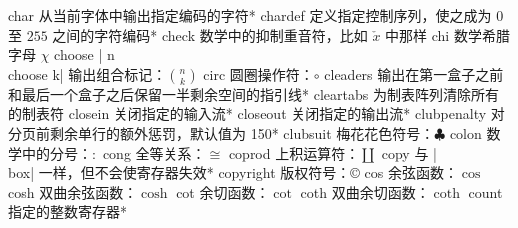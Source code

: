 \capcs char {从当前字体中输出指定编码的字符}*{}
\capcs chardef {定义指定控制序列，使之成为 0 至 $255$ 之间的字符编码}*{}
\capcs check {数学中的抑制重音符，比如 $\check x$ 中那样}{}{}
\capcs chi {数学希腊字母 $\chi$}{}{}
\capcs choose {| n\\choose k| 输出组合标记：$n \choose k$}{}{}
\capcs circ {圆圈操作符：$\circ$}{}{}
\capcs cleaders {输出在第一盒子之前和最后一个盒子之后保留一半剩余空间的指引线}*{}
\capcs cleartabs {为制表阵列清除所有的制表符}{}{}
\capcs closein {关闭指定的输入流}*{}
\capcs closeout {关闭指定的输出流}*{}
\capcs clubpenalty {对分页前剩余单行的额外惩罚，默认值为 150}*{}
\capcs clubsuit {梅花花色符号：$\clubsuit$}{}{}
\capcs colon {数学中的分号：$:$}{}{}
\capcs cong {全等关系：$\cong$}{}{}
\capcs coprod {上积运算符：$\coprod$}{}{}
\capcs copy {与 |\\box| 一样，但不会使寄存器失效}*{}
\capcs copyright {版权符号：\copyright}{}{}
\capcs cos {余弦函数：$\cos$}{}{}
\capcs cosh {双曲余弦函数：$\cosh$}{}{}
\capcs cot {余切函数：$\cot$}{}{}
\capcs coth {双曲余切函数：$\coth$}{}{}
\capcs count {指定的整数寄存器}*{}
